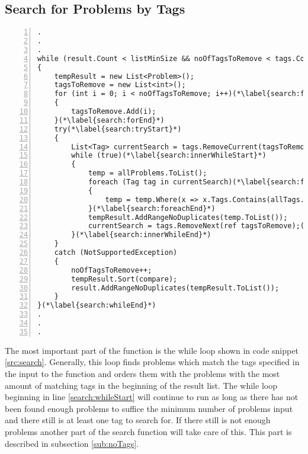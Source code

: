\subsection{Search for Problems by Tags}
\label{sub:searchTags}
\begin{lstlisting}[style=sourceCode, caption=\myCaption{The while loop which finds and sorts problems matching the input tags}, label=src:search, numbers=left, numberstyle=\footnotesize]
.
.
.
while (result.Count < listMinSize && noOfTagsToRemove < tags.Count)(*\label{search:whileStart}*)
{
	tempResult = new List<Problem>();
	tagsToRemove = new List<int>();
	for (int i = 0; i < noOfTagsToRemove; i++)(*\label{search:forStart}*)
	{
		tagsToRemove.Add(i);
	}(*\label{search:forEnd}*)
	try(*\label{search:tryStart}*)
	{
		List<Tag> currentSearch = tags.RemoveCurrent(tagsToRemove);
		while (true)(*\label{search:innerWhileStart}*)
		{
			temp = allProblems.ToList();
			foreach (Tag tag in currentSearch)(*\label{search:foreachStart}*)
			{
				temp = temp.Where(x => x.Tags.Contains(allTags.FirstOrDefault(y => y.Id == tag.Id))).ToList();
			}(*\label{search:foreachEnd}*)
			tempResult.AddRangeNoDuplicates(temp.ToList());
			currentSearch = tags.RemoveNext(ref tagsToRemove);(*\label{search:removeNext}*)
		}(*\label{search:innerWhileEnd}*)
	}
	catch (NotSupportedException)
	{
		noOfTagsToRemove++;
		tempResult.Sort(compare);
		result.AddRangeNoDuplicates(tempResult.ToList());
	}
}(*\label{search:whileEnd}*)
.
.
.
\end{lstlisting}

The most important part of the  function is the while loop shown in code snippet \ref{src:search}.
Generally, this loop finds problems which match the tags specified in the input to the function and orders them with the problems with the most amount of matching tags in the beginning of the result list.
The while loop beginning in line \ref{search:whileStart} will continue to run as long as there has not been found enough problems to suffice the minimum number of problems input and there still is at least one tag to search for.
If there still is not enough problems another part of the search function will take care of this.
This part is described in subsection \ref{sub:noTags}.

